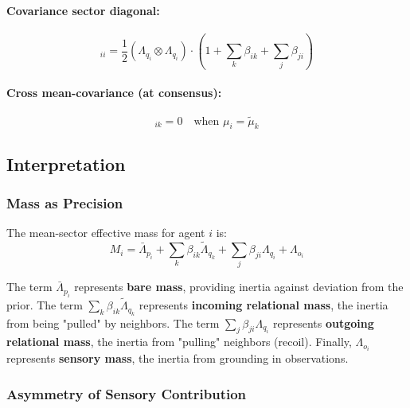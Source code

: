 \documentclass[12pt]{article}
\begin{document}
\paragraph{Covariance sector diagonal:}
\begin{equation}
[\mathbf{M}^\Sigma]_{ii} = \frac{1}{2}(\Lambda_{q_i} \otimes \Lambda_{q_i}) \cdot \left(1 + \sum_k \beta_{ik} + \sum_j \beta_{ji}\right)
\end{equation}

\paragraph{Cross mean-covariance (at consensus):}
\begin{equation}
[\mathbf{C}^{\mu\Sigma}]_{ik} = 0 \quad \text{when } \mu_i = \tilde{\mu}_k
\end{equation}

\subsection{Interpretation}

\subsubsection{Mass as Precision}

The mean-sector effective mass for agent $i$ is:
\begin{equation}
\boxed{
M_i = \bar{\Lambda}_{p_i} + \sum_k \beta_{ik}\tilde{\Lambda}_{q_k} + \sum_j \beta_{ji}\Lambda_{q_i} + \Lambda_{o_i}
}
\label{eq:effective_mass}
\end{equation}

The term $\bar{\Lambda}_{p_i}$ represents \textbf{bare mass}, providing inertia against deviation from the prior. The term $\sum_k \beta_{ik}\tilde{\Lambda}_{q_k}$ represents \textbf{incoming relational mass}, the inertia from being "pulled" by neighbors. The term $\sum_j \beta_{ji}\Lambda_{q_i}$ represents \textbf{outgoing relational mass}, the inertia from "pulling" neighbors (recoil). Finally, $\Lambda_{o_i}$ represents \textbf{sensory mass}, the inertia from grounding in observations.

\subsubsection{Asymmetry of Sensory Contribution}
\end{document}
